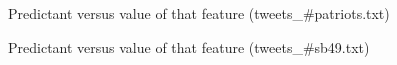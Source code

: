 \documentclass{article}
\begin{document}
\begin{figure}
\centering
{}
\caption{Predictant versus value of that feature (tweets\_\#patriots.txt)} \label{Q5_4}
\end{figure}

\begin{figure}
\centering
{}
\caption{Predictant versus value of that feature (tweets\_\#sb49.txt)} \label{Q5_5}
\end{figure}
\end{document}
